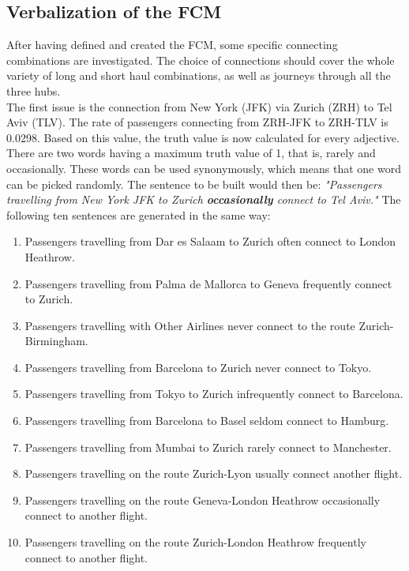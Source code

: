 \documentclass[conference]{IEEEtran}
\begin{document}
\subsection{Verbalization of the FCM}
\label{subsec:verbalization}
After having defined and created the FCM, some specific connecting combinations are investigated. The choice of connections should cover the whole variety of long and short haul combinations, as well as journeys through all the three hubs.\\
The first issue is the connection from New York (JFK) via Zurich (ZRH) to Tel Aviv (TLV). The rate of passengers connecting from ZRH-JFK to ZRH-TLV is 0.0298. Based on this value, the truth value is now calculated for every adjective. There are two words having a maximum truth value of 1, that is, rarely and occasionally. These words can be used synonymously, which means that one word can be picked randomly. The sentence to be built would then be: \newline \emph{"Passengers travelling from New York JFK to Zurich \textbf{occasionally} connect to Tel Aviv."} \newline The following ten sentences are generated in the same way:
\begin{enumerate}
\item Passengers travelling from Dar es Salaam to Zurich often connect to London Heathrow.
\item Passengers travelling from Palma de Mallorca to Geneva frequently connect to Zurich.
\item Passengers travelling with Other Airlines never connect to the route Zurich-Birmingham.
\item Passengers travelling from Barcelona to Zurich never connect to Tokyo.
\item Passengers travelling from Tokyo to Zurich infrequently connect to Barcelona.
\item Passengers travelling from Barcelona to Basel seldom connect to Hamburg.
\item Passengers travelling from Mumbai to Zurich rarely connect to Manchester.
\item Passengers travelling on the route Zurich-Lyon usually connect another flight.
\item Passengers travelling on the route Geneva-London Heathrow occasionally connect to another flight.
\item Passengers travelling on the route Zurich-London Heathrow frequently connect to another flight.
\end{enumerate}
\end{document}
